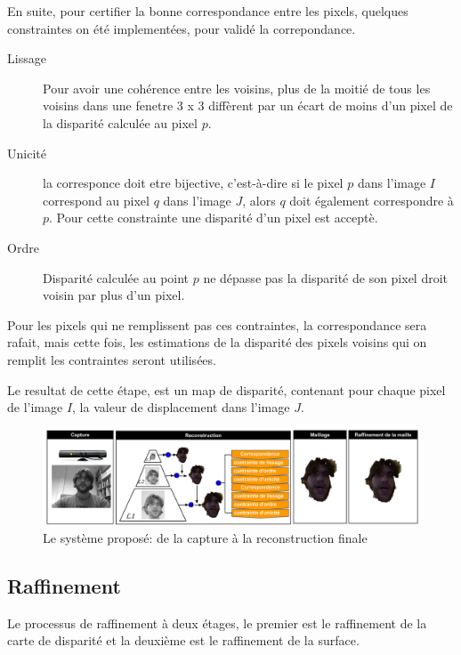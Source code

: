 \documentclass[a4paper,11pt]{article}
\begin{document}
En suite, pour certifier la bonne correspondance entre les pixels, quelques constraintes on été implementées, pour validé la correpondance.
\begin{description}

\item[Lissage] Pour avoir une cohérence entre les voisins, plus de la moitié de tous les voisins dans une fenetre 3 x 3 diffèrent par un écart de moins d'un pixel de la disparité calculée au pixel $p$.  

\item[Unicité] la corresponce doit etre bijective, c'est-à-dire si le pixel $p$ dans l'image $I$ correspond au pixel $q$ dans l'image $J$, alors $q$ doit également correspondre à $p$. Pour cette constrainte une disparité d'un pixel est acceptè.
\item[Ordre] Disparité calculée au point $p$ ne dépasse pas la disparité de son pixel droit voisin par plus d'un pixel.
\end{description}

Pour les pixels qui ne remplissent pas ces contraintes, la correspondance sera rafait, mais cette fois, les estimations de la disparité des pixels voisins qui on remplit les contraintes seront utilisées. 

Le resultat de cette étape, est un map de disparité, contenant pour chaque pixel de l'image $I$, la valeur de displacement dans l'image $J$. 

\begin{figure}[h!]
  \begin{center}
    \includegraphics[scale=0.35]{img/projSystem.png}
    \caption{Le système proposé: de la capture à la reconstruction finale}
  \end{center}
\end{figure}


\subsection{Raffinement}

Le processus de raffinement à deux étages, le premier est le raffinement de la carte de disparité et la deuxième est le raffinement de la surface. 
\end{document}
